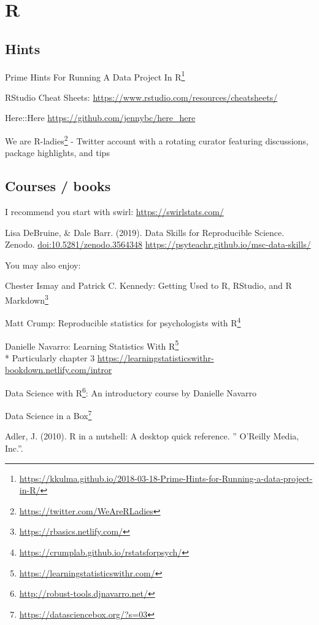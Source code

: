 \documentclass[
  12pt,
  a5paper,
]{book}
\DeclareRobustCommand{\href}[2]{#2\footnote{\url{#1}}}
\begin{document}
\hypertarget{r}{%
\section{R}\label{r}}

\hypertarget{hints}{%
\subsection{Hints}\label{hints}}

\href{https://kkulma.github.io/2018-03-18-Prime-Hints-for-Running-a-data-project-in-R/}{Prime Hints For Running A Data Project In R}

RStudio Cheat Sheets: \url{https://www.rstudio.com/resources/cheatsheets/}

Here::Here \url{https://github.com/jennybc/here_here}

\href{https://twitter.com/WeAreRLadies}{We are R-ladies} - Twitter account with a rotating curator featuring discussions, package highlights, and tips

\hypertarget{courses-books}{%
\subsection{Courses / books}\label{courses-books}}

I recommend you start with swirl: \url{https://swirlstats.com/}

Lisa DeBruine, \& Dale Barr. (2019). Data Skills for Reproducible Science. Zenodo. \url{doi:10.5281/zenodo.3564348} \url{https://psyteachr.github.io/msc-data-skills/}

You may also enjoy:

Chester Ismay and Patrick C. Kennedy: \href{https://rbasics.netlify.com/}{Getting Used to R, RStudio, and R Markdown}

Matt Crump: \href{https://crumplab.github.io/rstatsforpsych/}{Reproducible statistics for psychologists with R}

Danielle Navarro: \href{https://learningstatisticswithr.com/}{Learning Statistics With R}\\
* Particularly chapter 3 \url{https://learningstatisticswithr-bookdown.netlify.com/intror}

\href{http://robust-tools.djnavarro.net/}{Data Science with R}: An introductory course by Danielle Navarro

\href{https://datasciencebox.org/?s=03}{Data Science in a Box}

Adler, J. (2010). R in a nutshell: A desktop quick reference. '' O'Reilly Media, Inc.''.
\end{document}
